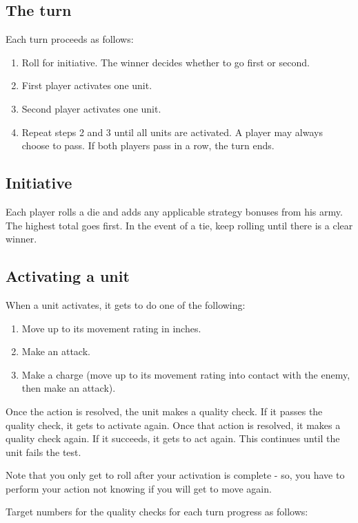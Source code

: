 \documentclass[12pt,titlepage]{article}
\begin{document}
\begin{multicols}{2}
  \section{The turn}
  Each turn proceeds as follows:
  \begin{enumerate}
  \item Roll for initiative. The winner decides whether to go first or
    second.
  \item First player activates one unit.
  \item Second player activates one unit.
  \item Repeat steps 2 and 3 until all units are activated. A player
    may always choose to pass. If both players pass in a row, the turn
    ends.
  \end{enumerate}

  \subsection{Initiative}
  Each player rolls a die and adds any applicable strategy bonuses
  from his army. The highest total goes first. In the event of a tie,
  keep rolling until there is a clear winner.

  \subsection{Activating a unit}

  When a unit activates, it gets to do one of the following:
  \begin{enumerate}
  \item Move up to its movement rating in inches.
  \item Make an attack.
  \item Make a charge (move up to its movement rating into contact
    with the enemy, then make an attack).
  \end{enumerate}

  Once the action is resolved, the unit makes a quality check. If it
  passes the quality check, it gets to activate again. Once that
  action is resolved, it makes a quality check again. If it succeeds,
  it gets to act again. This continues until the unit fails the test.

  Note that you only get to roll after your activation is complete -
  so, you have to perform your action not knowing if you will get to
  move again.

  Target numbers for the quality checks for each turn progress as
  follows:


\end{multicols}
\end{document}
